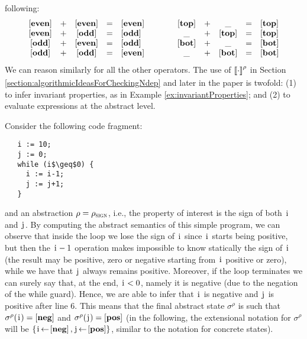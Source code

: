 \documentclass[prodmode,acmtocl]{acmsmall}
\newcommand{\BIND}[2]{#1\!\leftarrow\!#2}
\def\uco{\ensuremath{\rho}\xspace}
\def\astate{{\sigma^\rho}\xspace}
\def\ok#1{\mbox{\raisebox{0ex}[1ex][1ex]{$#1$}}}
\newcommand{\0}{\mbox{\bf 0}}
\def\ok#1{\mbox{\raisebox{0ex}[1ex][1ex]{$#1$}}}
\newcommand{\UNARYFUNCTION}[2]{#1\ifthenelse{\equal{#2}{}}{}{\left(#2\right)}}
\newcommand{\CODE}[1]{\ensuremath{\mbox{\lstinline!#1!}\xspace}\xspace}
\def\ii{\CODE{i}}
\def\jj{\CODE{j}}
\newcommand{\SEMANTICS}[1]{\left\llbracket #1 \right\rrbracket}
\def\EVEN{\ABSVAL{even}}
\def\ODD{\ABSVAL{odd}}
\def\TOP{\ABSVAL{top}}
\def\BOT{\ABSVAL{bot}}
\def\SIGNDOM{\ensuremath{\uco_{\textsc{sign}}}\xspace}
\def\POS{\ABSVAL{pos}}
\def\NEG{\ABSVAL{neg}}
\newcommand{\ABSVAL}[1]{\left[\mathbf{#1}\right]}
\newcommand{\ABSEVAL}[2]{\ok{\UNARYFUNCTION{\SEMANTICS{#1}^\rho}{#2}}}
\begin{document}
following:
\[ \begin{array}{ccccl@{\qquad\qquad}ccccl}
  \EVEN & + & \EVEN & = & \EVEN & \TOP & + & \_ & = & \TOP \\
  \EVEN & + & \ODD & = & \ODD & \_ & + & \TOP & = & \TOP \\
  \ODD & + & \EVEN & = & \ODD & \BOT & + & \_ & = & \BOT \\
  \ODD & + & \ODD & = & \EVEN & \_ & + & \BOT & = & \BOT \\
\end{array} \]
We can reason similarly for all the other operators.  The use of
$\ABSEVAL{\cdot}{}$ in Section
\ref{section:algorithmicIdeasForCheckingNdep} and later in the paper
is twofold: (1) to infer invariant properties, as in Example
\ref{ex:invariantProperties}; and (2) to evaluate expressions at the
abstract level.

\begin{example}
  \label{ex:invariantProperties}
  Consider the following code fragment:
  \begin{lstlisting}
   i := 10;
   j := 0;
   while (i$\geq$0) {
     i := i-1;
     j := j+1;
   }
  \end{lstlisting}
    and an abstraction $\uco=\SIGNDOM$,
  i.e., the property of interest is the sign of both \ii and \jj.  By
  computing the abstract semantics of this simple program, we can
  observe that inside the loop we lose the sign of \ii since \ii
  starts being positive, but then the $\ii-1$ operation makes
  impossible to know statically the sign of \ii (the result may
  be positive, zero or negative starting from \ii positive or zero),
  while we have that \jj always remains positive. Moreover, if the
  loop terminates we can surely say that, at the end, $\ii<0$, namely it is negative
  (due to the negation of the while guard). Hence, we are able to
  infer that \ii is negative and \jj is positive after line 6.  This
  means that the final abstract state $\astate$ is such that
  $\astate(\mbox{\ii}) = \NEG$ and $\astate(\mbox{\jj}) = \POS$ (in
  the following, the extensional notation for $\astate$ will be $\{
  \BIND{\mbox{\ii}}{\NEG},\BIND{\mbox{\jj}}{\POS} \}$, similar to the
  notation for concrete states).
\end{example}
\end{document}
